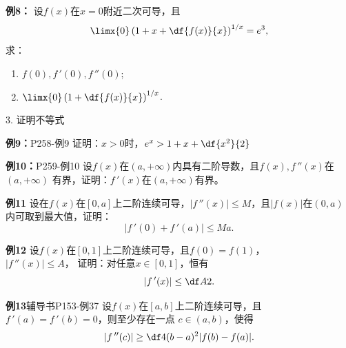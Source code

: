 \begin{frame}
	\linespread{1.2}
	\begin{alertblock}{{\bf 例8：}\hfill}
		设$f(x)$在$x=0$附近二次可导，且
		$$\limx{0}\left(1+x+\df{f(x)}{x}\right)^{1/x}=e^3,$$
		求：
		\begin{enumerate}
		  \item $f(0),f\,'(0),f\,''(0)$;
		  \item $\limx{0}\left(1+\df{f(x)}{x}\right)^{1/x}$.
		\end{enumerate}
	\end{alertblock}
\end{frame}

\begin{frame}{3. 证明不等式}
	\linespread{1.2}\pause
	\begin{exampleblock}{{\bf 例9：}\hfill P258-例9}
		证明：$x>0$时，$e^x>1+x+\df{x^2}{2}$
	\end{exampleblock}
	\bigskip\pause
	\begin{exampleblock}{{\bf 例10：}\hfill P259-例10}
		设$f(x)$在$(a,+\infty)$内具有二阶导数，且$f(x),f\,''(x)$在$(a,+\infty)$
		有界，证明：$f\,'(x)$在$(a,+\infty)$有界。
	\end{exampleblock}
\end{frame}

\begin{frame}
	\linespread{1.5}
	\begin{alertblock}{{\bf 例11}\hfill }
		设在$f(x)$在$[0,a]$上二阶连续可导，$|f\,''(x)|\leq M$，且$|f(x)|$在$(0,a)$内可取到最大值，证明：
		$$|f\,'(0)+f\,'(a)|\leq Ma.$$
	\end{alertblock}
\end{frame}

\begin{frame}
	\linespread{1.5}
	\begin{alertblock}{{\bf 例12}\hfill }
		设$f(x)$在$[0,1]$上二阶连续可导，且$f(0)=f(1)$， \\
		$|f\,''(x)|\leq A$，
		证明：对任意$x\in[0,1]$，恒有
		$$|f\,'(x)|\leq\df A2.$$
	\end{alertblock}
\end{frame}

\begin{frame}
	\linespread{1.5}
	\begin{alertblock}{{\bf 例13}\hfill 辅导书P153-例37}
		设$f(x)$在$[a,b]$上二阶连续可导，且$f\,'(a)=f\,'(b)=0$，则至少存在一点
		$c\in(a,b)$，使得
		$$|f\,''(c)|\geq \df 4{(b-a)^2}|f(b)-f(a)|.$$
	\end{alertblock}
\end{frame}



